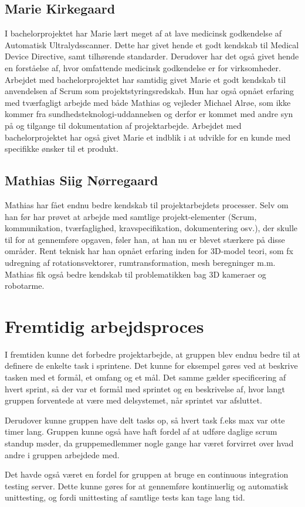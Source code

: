 \subsection{Marie Kirkegaard}
I bachelorprojektet har Marie lært meget af at lave medicinsk godkendelse af Automatisk Ultralydsscanner. Dette har givet hende et godt kendskab til Medical Device Directive, samt tilhørende standarder. Derudover har det også givet hende en forståelse af, hvor omfattende medicinsk godkendelse er for virksomheder. Arbejdet med bachelorprojektet har samtidig givet Marie et godt kendskab til anvendelsen af Scrum som projektstyringsredskab. Hun har også opnået erfaring med tværfagligt arbejde med både Mathias og vejleder Michael Alrøe, som ikke kommer fra sundhedsteknologi-uddannelsen og derfor er kommet med andre syn på og tilgange til dokumentation af projektarbejde. Arbejdet med bachelorprojektet har også givet Marie et indblik i at udvikle for en kunde med specifikke ønsker til et produkt. 

\subsection{Mathias Siig Nørregaard}
Mathias har fået endnu bedre kendskab til projektarbejdets processer. Selv om han før har prøvet at arbejde med samtlige projekt-elementer (Scrum, kommunikation, tværfaglighed, kravspecifikation, dokumentering osv.), der skulle til for at gennemføre opgaven, føler han, at han nu er blevet stærkere på disse områder. Rent teknisk har han opnået erfaring inden for 3D-model teori, som fx udregning af rotationsvektorer, rumtransformation, mesh beregninger m.m. Mathias fik også bedre kendskab til problematikken bag 3D kameraer og robotarme.

\section{Fremtidig arbejdsproces}
I fremtiden kunne det forbedre projektarbejde, at gruppen blev endnu bedre til at definere de enkelte task i sprintene. Det kunne for eksempel gøres ved at beskrive tasken med et formål, et omfang og et mål. Det samme gælder specificering af hvert sprint, så der var et formål med sprintet og en beskrivelse af, hvor langt gruppen forventede at være med delsystemet, når sprintet var afsluttet.

Derudover kunne gruppen have delt tasks op, så hvert task f.eks max var otte timer lang. Gruppen kunne også have haft fordel af at udføre daglige scrum standup møder, da gruppemedlemmer nogle gange har været forvirret over hvad andre i gruppen arbejdede med.

Det havde også været en fordel for gruppen at bruge en continuous integration testing server. Dette kunne gøres for at gennemføre kontinuerlig og automatisk unittesting, og fordi unittesting af samtlige tests kan tage lang tid.
